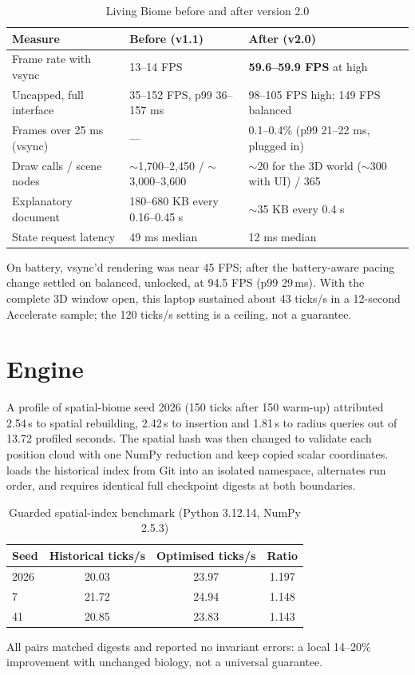 \begin{table}[htbp]
\centering
\caption{Living Biome before and after version 2.0}
\begin{tabularx}{\textwidth}{lLL}
\toprule
Measure & Before (v1.1) & After (v2.0) \\
\midrule
Frame rate with vsync & 13--14 FPS & \textbf{59.6--59.9 FPS} at high \\
Uncapped, full interface & 35--152 FPS, p99 36--157 ms & 98--105 FPS high; 149 FPS balanced \\
Frames over 25 ms (vsync) & --- & 0.1--0.4\% (p99 21--22 ms, plugged in) \\
Draw calls / scene nodes & $\sim$1{,}700--2{,}450 / $\sim$3{,}000--3{,}600 & $\sim$20 for the 3D world ($\sim$300 with UI) / 365 \\
Explanatory document & 180--680 KB every 0.16--0.45 s & $\sim$35 KB every 0.4 s \\
State request latency & 49 ms median & 12 ms median \\
\bottomrule
\end{tabularx}
\end{table}

On battery, vsync'd rendering was near 45 FPS; after the battery-aware pacing
change  settled on balanced, unlocked, at 94.5 FPS (p99 29\,ms). With the
complete 3D window open, this laptop sustained about 43 ticks/s in a 12-second
Accelerate sample; the 120 ticks/s setting is a ceiling, not a guarantee.

\section{Engine}
A profile of spatial-biome seed 2026 (150 ticks after 150 warm-up) attributed
2.54\,s to spatial rebuilding, 2.42\,s to insertion and 1.81\,s to radius queries
out of 13.72 profiled seconds. The spatial hash was then changed to validate each
position cloud with one NumPy reduction and keep copied scalar coordinates.
 loads the historical index from Git into an
isolated namespace, alternates run order, and requires identical full checkpoint
digests at both boundaries.

\begin{table}[htbp]
\centering
\caption{Guarded spatial-index benchmark (Python 3.12.14, NumPy 2.5.3)}
\begin{tabular}{lccc}
\toprule
Seed & Historical ticks/s & Optimised ticks/s & Ratio \\
\midrule
2026 & 20.03 & 23.97 & 1.197 \\
7 & 21.72 & 24.94 & 1.148 \\
41 & 20.85 & 23.83 & 1.143 \\
\bottomrule
\end{tabular}
\end{table}
All pairs matched digests and reported no invariant errors: a local 14--20\%
improvement with unchanged biology, not a universal guarantee.
